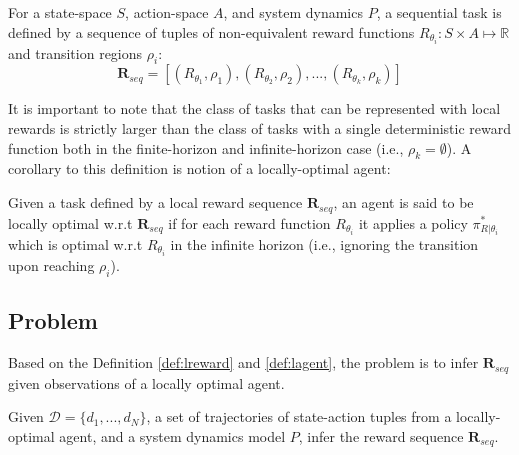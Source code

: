 \begin{definition}\label{def:lreward}
For a state-space $S$, action-space $A$, and system dynamics $P$, a sequential task is defined by a sequence of tuples of non-equivalent reward functions $R_{\theta_i}: S \times A \mapsto \mathbb{R}$ and transition regions $\rho_i$:
\[
\mathbf{R}_{seq} = [ (R_{\theta_1}, \rho_1) , (R_{\theta_2}, \rho_2), ..., (R_{\theta_k}, \rho_k) ]
\]
\end{definition}

It is important to note that the class of tasks that can be represented with local rewards is strictly larger than the class of tasks with a single deterministic reward function both in the finite-horizon and infinite-horizon case (i.e., $\rho_k = \emptyset$). A corollary to this definition is notion of a locally-optimal agent:

\begin{definition}\label{def:lagent}
Given a task defined by a local reward sequence $\mathbf{R}_{seq}$, an agent is said to be locally optimal w.r.t $\mathbf{R}_{seq}$ if for each reward function $R_{\theta_i}$ it applies a policy $\pi_{R | \theta_i}^*$ which is optimal w.r.t $R_{\theta_i}$ in the infinite horizon (i.e., ignoring the transition upon reaching $\rho_i$). 
\end{definition}

\subsection{\hirlfull Problem}
Based on the Definition \ref{def:lreward} and \ref{def:lagent}, the \hirlfull problem is to infer $\mathbf{R}_{seq}$ given observations of a locally optimal agent.

\begin{definition}[\hirlfull]
Given $\mathcal{D}=\{d_1,...,d_N\}$, a set of trajectories of state-action tuples from a locally-optimal agent, and a system dynamics model $P$, infer the reward sequence $\mathbf{R}_{seq}$.
\end{definition}
\fi
